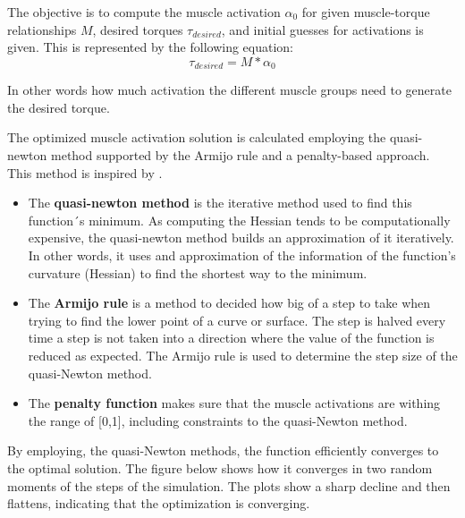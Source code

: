 The objective is to compute the muscle activation $\alpha_0$ for given muscle-torque relationships $M$, desired torques $\tau_{desired}$, and initial guesses for activations is given. This is represented by the following equation:
\begin{equation}
    \tau_{desired} = M * \alpha_0
\end{equation}

In other words how much activation the different muscle groups need to generate the desired torque. 

The optimized muscle activation solution is calculated employing the quasi-newton method supported by the Armijo rule and a penalty-based approach. This method is inspired by \cite{QSC}.

\begin{itemize}
    \item The \textbf{quasi-newton method} is the iterative method used to find this function´s minimum. As computing the Hessian tends to be computationally expensive, the quasi-newton method builds an approximation of it iteratively. In other words, it uses and approximation of the information of the function's curvature (Hessian) to find the shortest way to the minimum. 
    \item The \textbf{Armijo rule } is a method to decided how big of a step to take when trying to find the lower point of a curve or surface.  The step is halved every time a step is not taken into a direction where the value of the function is reduced as expected. The Armijo rule is used to determine the step size of the quasi-Newton method. 
    \item The \textbf{penalty function} makes sure that the muscle activations are withing the range of [0,1], including constraints to the quasi-Newton method. 
\end{itemize}

By employing, the quasi-Newton methods, the function efficiently converges to the optimal solution. The figure below shows how it converges in two random moments of the steps of the simulation. The plots show a sharp decline and then flattens, indicating that the optimization is converging.


